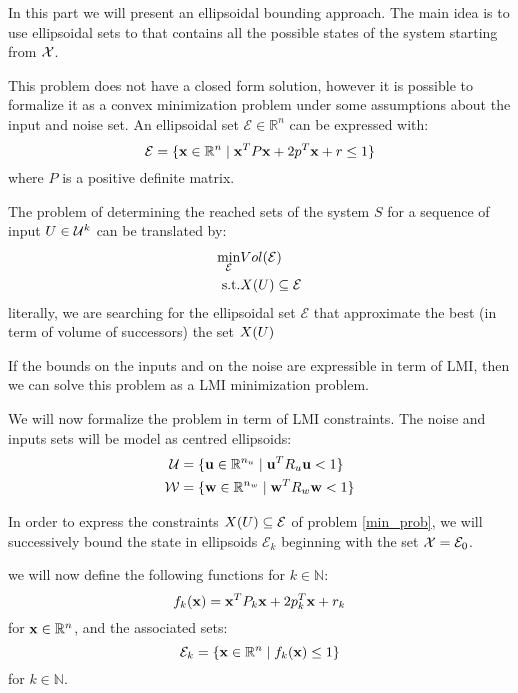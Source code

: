 In this part we will present an ellipsoidal bounding approach.
The main idea is to use ellipsoidal sets to that contains all the possible states of the system starting from $\mathcal{X}$.

\newcommand{\ellipse}{\mathcal{E}}%
This problem does not have a closed form solution, however it is possible to formalize it as a convex minimization problem under some assumptions about the input and noise set.
An ellipsoidal set $\ellipse \in \mathbb{R}^n$ can be expressed with:
\begin{equation}
\ellipse  = \{\x \in \mathbb{R}^n \mid \x^T P \x + 2 p^T \x + r \leq 1 \} 
\end{equation}
where $P$ is a positive definite matrix.

The problem of determining the reached sets of the system $S$ for a sequence of input $U \in \mathcal{U}^k$ can be translated by:
\begin{equation} \label{min_prob}
\begin{aligned}
\min_{\ellipse} & Vol(\ellipse)\\
\textrm{s.t.}   & \X(U) \subseteq \ellipse
\end{aligned}
\end{equation}
literally, we are searching for the ellipsoidal set $\ellipse$ that approximate the best (in term of volume of successors) the set $X(U)$

If the bounds on the inputs and on the noise are expressible in term of LMI, then we can solve this problem as a LMI minimization problem.

We will now formalize the problem in term of LMI constraints.
The noise and inputs sets will be model as centred ellipsoids:
\begin{equation}
\begin{aligned}
\mathcal{U} &= \{  \mathbf{u} \in \mathbb{R}^{n_u} \mid  \mathbf{u}^T R_u  \mathbf{u} < 1 \}\\
\mathcal{W} &= \{  \mathbf{w} \in \mathbb{R}^{n_w} \mid  \mathbf{w}^T R_w  \mathbf{w} < 1 \}\\
\end{aligned}
\end{equation}

In order to express the constraints $\X(U) \subseteq \ellipse$ of problem \ref{min_prob}, we will successively bound the state in ellipsoids $\ellipse_k$ beginning with the set $\Xinv = \ellipse_0$.

we will now define the following functions for $k \in \mathbb{N}$:
\begin{equation}
f_k( \mathbf{x}) =  \mathbf{x}^T P_k  \mathbf{x} + 2 p_k^T  \mathbf{x} + r_k
\end{equation}
for $ \mathbf{x} \in \mathbb{R}^n$, and the associated sets:
\begin{equation}
\ellipse_k = \{ \x \in \R^n \mid f_k(\x) \leq 1 \}
\end{equation}
for $k\in\mathbb{N}$.

